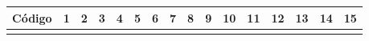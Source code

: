 	\begin{center}
		\begin{longtable}[pos]{| c | c | c | c | c | c | c | c | c | c | c | c | c | c | c | c |} \hline
			\multicolumn{1}{|c|}{\cellcolor[gray]{0.9}\textbf{\small Código}} & 
			\multicolumn{1}{c|}{\cellcolor[gray]{0.9}\textbf{1}} & 
			\multicolumn{1}{c|}{\cellcolor[gray]{0.9}\textbf{2}} &
			\multicolumn{1}{c|}{\cellcolor[gray]{0.9}\textbf{3}} &
            \multicolumn{1}{c|}{\cellcolor[gray]{0.9}\textbf{4}} &
            \multicolumn{1}{c|}{\cellcolor[gray]{0.9}\textbf{5}} &
            \multicolumn{1}{c|}{\cellcolor[gray]{0.9}\textbf{6}} &
            \multicolumn{1}{c|}{\cellcolor[gray]{0.9}\textbf{7}} &
            \multicolumn{1}{c|}{\cellcolor[gray]{0.9}\textbf{8}} &
            \multicolumn{1}{c|}{\cellcolor[gray]{0.9}\textbf{9}} &
            \multicolumn{1}{c|}{\cellcolor[gray]{0.9}\textbf{10}} &
			\multicolumn{1}{c|}{\cellcolor[gray]{0.9}\textbf{11}} &
			\multicolumn{1}{c|}{\cellcolor[gray]{0.9}\textbf{12}} &
            \multicolumn{1}{c|}{\cellcolor[gray]{0.9}\textbf{13}} &
            \multicolumn{1}{c|}{\cellcolor[gray]{0.9}\textbf{14}} &
            \multicolumn{1}{c|}{\cellcolor[gray]{0.9}\textbf{15}} \\ \hline
			\endhead
			\hline
			\endlastfoot
			

\end{longtable}
\end{center}
